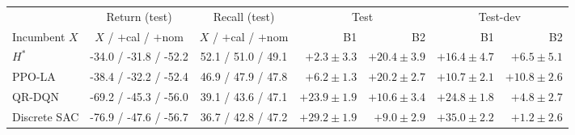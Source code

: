 \begin{tabular}{@{}lccrrrr@{}}
\toprule
 & Return (test) & Recall (test) & \multicolumn{2}{c}{Test} & \multicolumn{2}{c}{Test-dev}\\
\cmidrule(lr){4-5}\cmidrule(lr){6-7}
Incumbent $X$ & $X$ / $+$cal / $+$nom & $X$ / $+$cal / $+$nom & B1 & B2 & B1 & B2\\
\midrule
$H^*$ & -34.0 / -31.8 / -52.2 & 52.1 / 51.0 / 49.1 & $+2.3\pm3.3$ & $\mathbf{+20.4}\pm3.9$ & $\mathbf{+16.4}\pm4.7$ & $\mathbf{+6.5}\pm5.1$\\
PPO-LA & -38.4 / -32.2 / -52.4 & 46.9 / 47.9 / 47.8 & $\mathbf{+6.2}\pm1.3$ & $\mathbf{+20.2}\pm2.7$ & $\mathbf{+10.7}\pm2.1$ & $\mathbf{+10.8}\pm2.6$\\
QR-DQN & -69.2 / -45.3 / -56.0 & 39.1 / 43.6 / 47.1 & $\mathbf{+23.9}\pm1.9$ & $\mathbf{+10.6}\pm3.4$ & $\mathbf{+24.8}\pm1.8$ & $\mathbf{+4.8}\pm2.7$\\
Discrete SAC & -76.9 / -47.6 / -56.7 & 36.7 / 42.8 / 47.2 & $\mathbf{+29.2}\pm1.9$ & $\mathbf{+9.0}\pm2.9$ & $\mathbf{+35.0}\pm2.2$ & $+1.2\pm2.6$\\
\bottomrule
\end{tabular}
